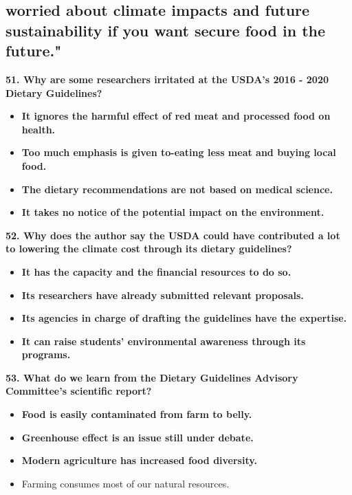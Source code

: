 \documentclass[UTF8,11pt]{ctexart}
\begin{document}
\subsection*{\textbf{worried about climate impacts and future sustainability if you want secure food in the future."}}


\textbf{51. Why are some researchers irritated at the USDA's 2016 - 2020 Dietary Guidelines?}


\begin{itemize}[leftmargin=2em,itemsep=.2em,topsep=.4em]\item[A.] \textbf{It ignores the harmful effect of red meat and processed food on health.}
\item[B.] \textbf{Too much emphasis is given to-eating less meat and buying local food.}
\item[C.] \textbf{The dietary recommendations are not based on medical science.}
\item[D.] \textbf{It takes no notice of the potential impact on the environment.}
\end{itemize}

\textbf{52. Why does the author say the USDA could \textperiodcentered{}have contributed a lot to lowering the climate cost through} \textbf{its dietary guidelines?}


\begin{itemize}[leftmargin=2em,itemsep=.2em,topsep=.4em]\item[A.] \textbf{It has the capacity and the financial resources to do so.}
\item[B.] \textbf{Its researchers have already submitted relevant proposals.}
\item[C.] \textbf{Its agencies in charge of drafting the guidelines have the expertise.}
\item[D.] \textbf{It can raise students' environmental awareness through its programs.}
\end{itemize}

\textbf{53. What do we learn from the Dietary Guidelines Advisory Committee's scientific report?}


\begin{itemize}[leftmargin=2em,itemsep=.2em,topsep=.4em]\item[A.] \textbf{Food is easily contaminated from farm to belly.}
\item[B.] \textbf{Greenhouse effect is an issue still under debate.}
\item[C.] \textbf{Modern agriculture has increased food diversity.}
\item[D.] Farming consumes most of our natural resources.
\end{itemize}
\end{document}
